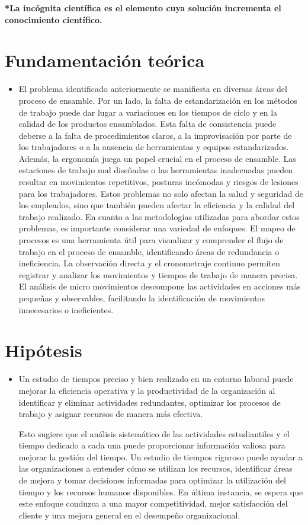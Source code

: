     \textbf{*La incógnita científica es el elemento cuya solución incrementa el conocimiento científico.}
    \section{Fundamentación teórica}
    
    \begin{itemize}
        \item 
    El problema identificado anteriormente se manifiesta en diversas áreas del proceso de ensamble. Por un lado, la falta de estandarización en los métodos de trabajo puede dar lugar a variaciones en los tiempos de ciclo y en la calidad de los productos ensamblados. Esta falta de consistencia puede deberse a la falta de procedimientos claros, a la improvisación por parte de los trabajadores o a la ausencia de herramientas y equipos estandarizados.
    Además, la ergonomía juega un papel crucial en el proceso de ensamble. Las estaciones de trabajo mal diseñadas o las herramientas inadecuadas pueden resultar en movimientos repetitivos, posturas incómodas y riesgos de lesiones para los trabajadores. Estos problemas no solo afectan la salud y seguridad de los empleados, sino que también pueden afectar la eficiencia y la calidad del trabajo realizado.
    En cuanto a las metodologías utilizadas para abordar estos problemas, es importante considerar una variedad de enfoques. El mapeo de procesos es una herramienta útil para visualizar y comprender el flujo de trabajo en el proceso de ensamble, identificando áreas de redundancia o ineficiencia. La observación directa y el cronometraje continuo permiten registrar y analizar los movimientos y tiempos de trabajo de manera precisa. El análisis de micro movimientos descompone las actividades en acciones más pequeñas y observables, facilitando la identificación de movimientos innecesarios o ineficientes.\cite{book}
    
    \end{itemize}
    \section{Hipótesis}
    
    \begin{itemize}
        \item Un estudio de tiempos preciso y bien realizado en un entorno laboral puede mejorar la eficiencia operativa y la productividad de la organización al identificar y eliminar actividades redundantes, optimizar los procesos de trabajo y asignar recursos de manera más efectiva.
    
    Esto sugiere que el análisis sistemático de las actividades estudiantiles y el tiempo dedicado a cada una puede proporcionar información valiosa para mejorar la gestión del tiempo. Un estudio de tiempos riguroso puede ayudar a las organizaciones a entender cómo se utilizan los recursos, identificar áreas de mejora y tomar decisiones informadas para optimizar la utilización del tiempo y los recursos humanos disponibles. En última instancia, se espera que este enfoque conduzca a una mayor competitividad, mejor satisfacción del cliente y una mejora general en el desempeño organizacional.
    \end{itemize}
